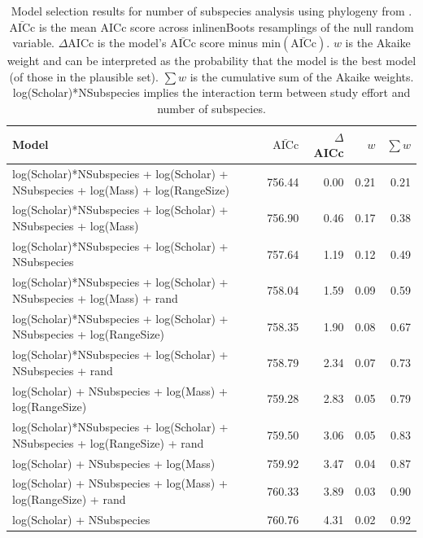 \begin{table}[ht]
\centering
\caption[
  Full model selection results for number of subspecies analysis using alternative phylogeny. 
]{
  Model selection results for number of subspecies analysis using phylogeny from \cite{jones2005bats}. 
  $\bar{\text{AICc}}$ is the mean AICc score across 
inline{nBoots} resamplings of the null random variable. 
  $\Delta$AICc is the model's $\bar{\text{AICc}}$ score minus $\text{min}(\bar{\text{AICc}})$. 
  $w$ is the Akaike weight and can be interpreted as the probability that the model is the best model (of those in the plausible set).
  $\sum w$ is the cumulative sum of the Akaike weights.
  log(Scholar)*NSubspecies implies the interaction term between study effort and number of subspecies.
  } 
\label{A-modelWeights2}
\begingroup\tiny
\begin{tabular}{@{}lrrrr@{}}
  \toprule
Model & $\bar{\text{AICc}}$ & $\Delta$AICc & $w$ & $\sum w$ \\ 
  \midrule
log(Scholar)*NSubspecies + log(Scholar) + NSubspecies + log(Mass) + log(RangeSize) & 756.44 & 0.00 & 0.21 & 0.21 \\ 
  log(Scholar)*NSubspecies + log(Scholar) + NSubspecies + log(Mass) & 756.90 & 0.46 & 0.17 & 0.38 \\ 
  log(Scholar)*NSubspecies + log(Scholar) + NSubspecies & 757.64 & 1.19 & 0.12 & 0.49 \\ 
  log(Scholar)*NSubspecies + log(Scholar) + NSubspecies + log(Mass) + rand & 758.04 & 1.59 & 0.09 & 0.59 \\ 
  log(Scholar)*NSubspecies + log(Scholar) + NSubspecies + log(RangeSize) & 758.35 & 1.90 & 0.08 & 0.67 \\ 
  log(Scholar)*NSubspecies + log(Scholar) + NSubspecies + rand & 758.79 & 2.34 & 0.07 & 0.73 \\ 
  log(Scholar) + NSubspecies + log(Mass) + log(RangeSize) & 759.28 & 2.83 & 0.05 & 0.79 \\ 
  log(Scholar)*NSubspecies + log(Scholar) + NSubspecies + log(RangeSize) + rand & 759.50 & 3.06 & 0.05 & 0.83 \\ 
  log(Scholar) + NSubspecies + log(Mass) & 759.92 & 3.47 & 0.04 & 0.87 \\ 
  log(Scholar) + NSubspecies + log(Mass) + log(RangeSize) + rand & 760.33 & 3.89 & 0.03 & 0.90 \\ 
  log(Scholar) + NSubspecies & 760.76 & 4.31 & 0.02 & 0.92 \\ 

\end{tabular}
\end{table}
